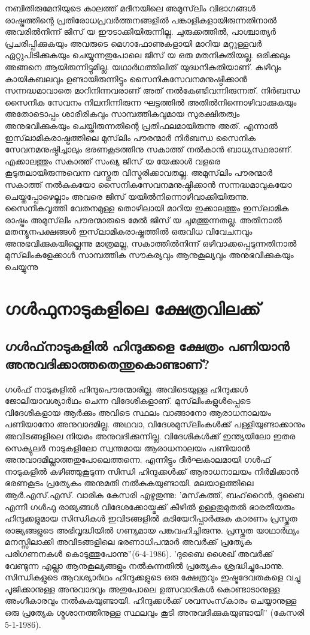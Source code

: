നബിതിരുമേനിയുടെ കാലത്ത് മദീനയിലെ അമുസ്‌ലിം വിഭാഗങ്ങള്‍ രാഷ്ട്രത്തിന്റെ പ്രതിരോധപ്രവര്‍ത്തനങ്ങളില്‍ പങ്കാളികളായിരുന്നതിനാല്‍ അവരില്‍നിന്ന് ജിസ് യ ഈടാക്കിയിരുന്നില്ല.
ചുരുക്കത്തില്‍, പാശ്ചാത്യര്‍ പ്രചരിപ്പിക്കുകയും അവരുടെ മെഗാഫോണുകളായി മാറിയ മറ്റുള്ളവര്‍ ഏറ്റുപിടിക്കുകയും ചെയ്യുന്നതുപോലെ ജിസ് യ ഒരു മതനികുതിയല്ല. ഒരിക്കലും അങ്ങനെ ആയിരുന്നിട്ടുമില്ല. യഥാര്‍ഥത്തിലിത് യുദ്ധനികുതിയാണ്. കഴിവും കായികബലവും ഉണ്ടായിരുന്നിട്ടും സൈനികസേവനമനുഷ്ഠിക്കാന്‍ സന്നദ്ധമാവാതെ മാറിനിന്നവരാണ് അത് നല്‍കേണ്ടിവന്നിരുന്നത്. നിര്‍ബന്ധ സൈനിക സേവനം നിലനിന്നിരുന്ന ഘട്ടത്തില്‍ അതില്‍നിന്നൊഴിവാക്കുകയും അതോടൊപ്പം ശാരീരികവും സാമ്പത്തികവുമായ സുരക്ഷിതത്വം അനുഭവിക്കുകയും ചെയ്തിരുന്നതിന്റെ പ്രതിഫലമായിരുന്നു അത്. എന്നാല്‍ ഇസ്‌ലാമികരാഷ്ട്രത്തിലെ മുസ്‌ലിം പൗരന്മാര്‍ നിര്‍ബന്ധ സൈനിക സേവനമനുഷ്ഠിച്ചാലും ഭരണകൂടത്തിനു സകാത്ത് നല്‍കാന്‍ ബാധ്യസ്ഥരാണ്. എക്കാലത്തും സകാത്ത് സംഖ്യ ജിസ് യ യേക്കാള്‍ വളരെ കൂടുതലായിരുന്നുവെന്ന വസ്തുത വിസ്മരിക്കാവതല്ല. അമുസ്‌ലിം പൗരന്മാര്‍ സകാത്ത് നല്‍കുകയോ സൈനികസേവനമനുഷ്ഠിക്കാന്‍ സന്നദ്ധമാവുകയോ ചെയ്തപ്പോഴെല്ലാം അവരെ ജിസ് യയില്‍നിന്നൊഴിവാക്കിയിരുന്നു. സൈനികവൃത്തി വേതനമുള്ള തൊഴിലായി മാറിയ ഇക്കാലത്തും ഇസ്‌ലാമിക രാഷ്ട്രം അമുസ്‌ലിം പൗരന്മാരുടെ മേല്‍ ജിസ് യ ചുമത്തുന്നതല്ല. അതിനാല്‍ മതന്യൂനപക്ഷങ്ങള്‍ ഇസ്‌ലാമികരാഷ്ട്രത്തില്‍ ഒരുവിധ വിവേചനവും അനുഭവിക്കുകയില്ലെന്നു മാത്രമല്ല, സകാത്തില്‍നിന്ന് ഒഴിവാക്കപ്പെടുന്നതിനാല്‍ മുസ്‌ലിംകളേക്കാള്‍ സാമ്പത്തിക സൗകര്യവും ആനുകൂല്യവും അനുഭവിക്കുകയും ചെയ്യുന്നു
\chapter{ഗള്‍ഫുനാടുകളിലെ ക്ഷേത്രവിലക്ക് }
 \section{ഗള്‍ഫ്‌നാടുകളില്‍ ഹിന്ദുക്കളെ ക്ഷേത്രം പണിയാന്‍ അനുവദിക്കാത്തതെന്തുകൊണ്ടാണ്?}

 ഗള്‍ഫ് നാടുകളില്‍ ഹിന്ദുപൌരന്മാരില്ല. അവിടെയുള്ള ഹിന്ദുക്കള്‍ ജോലിയാവശ്യാര്‍ഥം ചെന്ന വിദേശികളാണ്. മുസ്‌ലിംകളുള്‍പ്പെടെ വിദേശികളായ ആര്‍ക്കും അവിടെ സ്ഥലം വാങ്ങാനോ ആരാധനാലയം പണിയാനോ അനുവാദമില്ല. അഥവാ, വിദേശമുസ്‌ലിംകള്‍ക്ക് പള്ളിയുണ്ടാക്കാനും അവിടങ്ങളിലെ നിയമം അനുവദിക്കുന്നില്ല. വിദേശികള്‍ക്ക് ഇന്ത്യയിലോ ഇതര സെക്യുലര്‍ നാടുകളിലോ സ്വന്തമായ ആരാധനാലയം പണിയാന്‍ അനുവാദമില്ലാത്തതുപോലെത്തന്നെ.
എന്നിട്ടും ദീര്‍ഘകാലമായി ഗള്‍ഫ് നാടുകളില്‍ കഴിഞ്ഞുകൂടുന്ന സിന്ധി ഹിന്ദുക്കള്‍ക്ക് ആരാധനാലയം നിര്‍മിക്കാന്‍ ഭരണകൂടം പ്രത്യേകം അനുമതി നല്‍കുകയുണ്ടായി. മലയാളത്തിലെ ആര്‍.എസ്.എസ്. വാരിക കേസരി എഴുതുന്നു: 'മസ്‌കത്ത്, ബഹ്‌റൈന്‍, ദുബൈ എന്നീ ഗള്‍ഫു രാജ്യങ്ങള്‍ വിദേശക്കോയ്മക്ക് കീഴില്‍ ഉള്ളതുമുതല്‍ ഭാരതീയരും ഹിന്ദുക്കളുമായ സിന്ധികള്‍ ഇവിടങ്ങളില്‍ കുടിയേറിപ്പാര്‍ക്കുക കാരണം പ്രസ്തുത രാജ്യങ്ങളുടെ അഭിവൃദ്ധിയില്‍ ഗണ്യമായ പങ്കുവഹിച്ചിരുന്നു. പ്രസ്തുത യാഥാര്‍ഥ്യം മനസ്സിലാക്കി അവിടങ്ങളിലെ ഭരണാധിപന്മാര്‍ അവര്‍ക്ക് പ്രത്യേക പരിഗണനകള്‍ കൊടുത്തുപോന്നു''(6-4-1986).
'ദുബൈ ശൈഖ് അവര്‍ക്ക് വേണ്ടുന്ന എല്ലാ ആനുകൂല്യങ്ങളും നല്‍കുന്നതില്‍ പ്രത്യേകം ശ്രദ്ധിച്ചുപോന്നു. സിന്ധികളുടെ ആവശ്യാര്‍ഥം ഹിന്ദുക്കളുടെ ഒരു ക്ഷേത്രവും ഇഷ്ടദേവതകളെ വച്ചു പൂജിക്കാനുള്ള അനുവാദവും അതുപോലെ ഉത്സവാദികള്‍ കൊണ്ടാടാനുള്ള അംഗീകാരവും നല്‍കുകയുണ്ടായി. ഹിന്ദുക്കള്‍ക്ക് ശവസംസ്‌കാരം ചെയ്യാനുള്ള ഒരു പ്രത്യേക ശ്മശാനത്തിനുള്ള സ്ഥലവും കൂടി അനുവദിക്കുകയുണ്ടായി'' (കേസരി 5-1-1986). 
